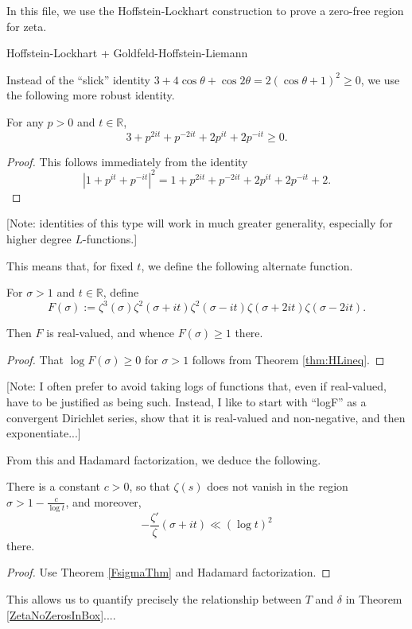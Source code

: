 

In this file, we use the Hoffstein-Lockhart construction to prove a zero-free region for zeta.

Hoffstein-Lockhart + Goldfeld-Hoffstein-Liemann

Instead of the ``slick'' identity $3+4\cos\theta+\cos2\theta=2(\cos\theta+1)^2\ge0$, we use the following  more robust identity.
\begin{theorem}\label{thm:HLineq}
For any $p>0$ and $t\in\mathbb{R}$,
$$
3+p^{2it}+p^{-2it}+2p^{it}+2p^{-it} \ge 0.
$$
\end{theorem}
\begin{proof}
This follows immediately from the identity
$$
|1+p^{it}+p^{-it}|^2=1+p^{2it}+p^{-2it}+2p^{it}+2p^{-it}+2.
$$
\end{proof}
[Note: identities of this type will work in much greater generality, especially for
higher degree $L$-functions.]

This means that, for fixed $t$, we define the following alternate function.
\begin{definition}\label{FsigmaDef} For $\sigma>1$ and $t\in\mathbb{R}$, define
$$
F(\sigma) := \zeta^3(\sigma)\zeta^2(\sigma+it)\zeta^2(\sigma-it)\zeta(\sigma+2it)\zeta(\sigma-2it).
$$
\end{definition}
\begin{theorem}\label{FsigmaThm}
Then $F$ is real-valued, and
whence $F(\sigma)\ge1$ there.
\end{theorem}
\begin{proof}
That
$\log F(\sigma)\ge0$ for $\sigma>1$ follows from
Theorem \ref{thm:HLineq}.
\end{proof}
[Note: I often prefer to avoid taking logs of functions that, even if real-valued, have to be justified as being such. Instead, I like to start with ``logF'' as a convergent
Dirichlet series, show that it is real-valued and non-negative, and then exponentiate...]

From this and Hadamard factorization, we deduce the following.
\begin{theorem}\label{thm:StrongZeroFree}
There is a constant $c>0$, so that $\zeta(s)$ does not vanish in
the region $\sigma>1-\frac{c}{\log t}$, and moreover,
$$
-\frac{\zeta'}{\zeta}(\sigma+it) \ll (\log t)^2
$$
there.
\end{theorem}
\begin{proof}
Use Theorem \ref{FsigmaThm} and Hadamard factorization.
\end{proof}

This allows us to quantify precisely the relationship between $T$ and $\delta$ in
Theorem \ref{ZetaNoZerosInBox}....


